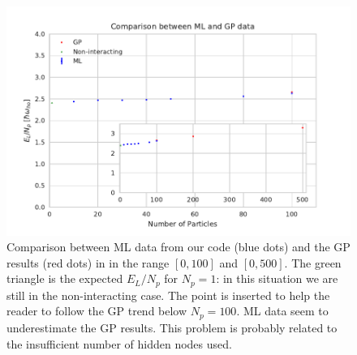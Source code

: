 \begin{figure}[H]
	\centering
	\centerline{\includegraphics[scale=1.2]{plot_finale.pdf}}
	\caption{Comparison between ML data from our code (blue dots) and the GP results (red dots) in \cite{DalfString} in the range $[0,100]$ and $[0,500]$. The green triangle is the expected $E_L/N_p$ for $N_p=1$: in this situation we are still in the non-interacting case. The point is inserted to help the reader to follow the GP trend below $N_p=100$. ML data seem to underestimate the GP results. This problem is probably related to the insufficient number of hidden nodes used.}
	\label{Fig:9}
\end{figure} 